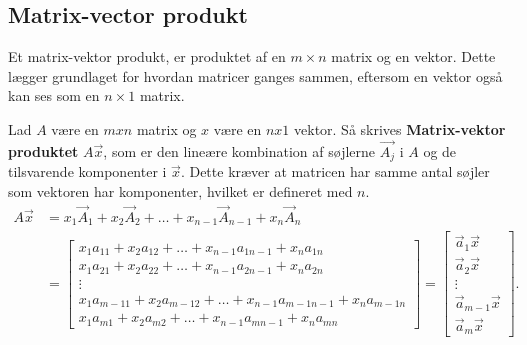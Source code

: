 \subsection{Matrix-vector produkt}
Et matrix-vektor produkt, er produktet af en $m\times n$ matrix og en vektor. Dette lægger grundlaget for hvordan matricer ganges sammen, eftersom en vektor også kan ses som en $n\times1$ matrix. 
\begin{defn}
Lad $A$ være en $mxn$ matrix og $x$ være en $nx1$ vektor. Så skrives \textbf{Matrix-vektor produktet} $A\vec{x}$, som er den lineære kombination af søjlerne $\vec{A_j}$ i $A$ og de tilsvarende komponenter i $\vec{x}$. Dette kræver at matricen har samme antal søjler som vektoren har komponenter, hvilket er defineret med $n$.
\begin{align*}
A\vec{x}&=x_1\vec{A}_1+x_2\vec{A}_2+ \dots +x_{n-1}\vec{A}_{n-1}+x_n\vec{A}_n \\
&=
\begin{bmatrix}
x_1a_{1 1}+x_2a_{1 2}+\dots +x_{n-1}a_{1 n-1}+x_na_{1 n} \\
x_1a_{2 1}+x_2a_{2 2}+\dots +x_{n-1}a_{2 n-1}+x_na_{2 n}\\
\vdots\\
x_1a_{m-1 1}+x_2a_{m-1 2}+\dots +x_{n-1}a_{m-1 n-1}+x_na_{m-1 n} \\
x_1a_{m 1}+x_2a_{m 2}+\dots +x_{n-1}a_{m n-1}+x_na_{m n}
\end{bmatrix}
=
\begin{bmatrix}
\vec{a}_1\vec{x}\\
\vec{a}_2\vec{x}\\
\vdots\\
\vec{a}_{m-1}\vec{x}\\
\vec{a}_m\vec{x}
\end{bmatrix}.
\end{align*}
\end{defn}

